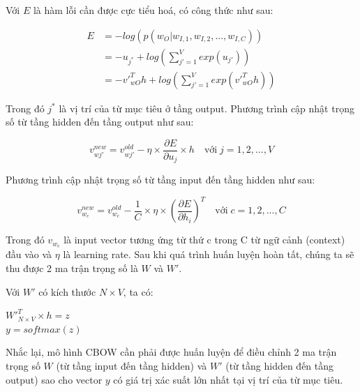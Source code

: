 Với $E$ là hàm lỗi cần được cực tiểu hoá, có công thức như sau:
\begin{center}
    \begin{equation}
    \begin{split}
        E & = -log\left( p\left( w_{O} | w_{I,1},w_{I,2}, ..., w_{I,C} \right) \right) \\
        & = -u_{j^*} + log\left( \sum_{j'=1}^{V}exp\left( u_{j'} \right) \right) \\
        & = -v'^T_{wO} h + log\left( \sum_{j'=1}^{V}exp\left( v'^T_{wO} h \right) \right)
    \end{split}
    \end{equation}
\end{center}

Trong đó $j^*$ là vị trí của từ mục tiêu ở tầng output. Phương trình cập nhật trọng số từ tầng hidden đến tầng output như sau:
\begin{center}
    \begin{equation}
        v_{wj'}^{new} = v_{wj'}^{old} - \eta \times \frac{\partial E}{\partial u_{j}} \times h \quad \textrm{với} \; j = 1, 2, ..., V
    \end{equation}
\end{center}

Phương trình cập nhật trọng số từ tầng input đến tầng hidden như sau:
\begin{center}
    \begin{equation}
        v_{w_{c}}^{new} = v_{w_{c}}^{old} - \frac{1}{C} \times \eta \times \left( \frac{\partial E}{\partial h_{i}} \right)^T \quad \textrm{với} \; c = 1, 2, ..., C
    \end{equation}
\end{center}

Trong đó $v_{w_{c}}$ là input vector tương ứng từ thứ c trong C từ ngữ cảnh (context) đầu vào và $\eta$ là learning rate. Sau khi quá trình huấn luyện hoàn tất, chúng ta sẽ thu được 2 ma trận trọng số là $W$ và $W'$.

Với $W'$ có kích thước $N \times V$, ta có:
\begin{center}
    $W'^T_{N\times V}\times h = z$ \\
    $y = softmax(z)$
\end{center}

Nhắc lại, mô hình CBOW cần phải được huấn luyện để điều chỉnh 2 ma trận trọng số $W$ (từ tầng input đến tầng hidden) và $W'$ (từ tầng hidden đến tầng output) sao cho vector $y$ có giá trị xác suất lớn nhất tại vị trí của từ mục tiêu.

